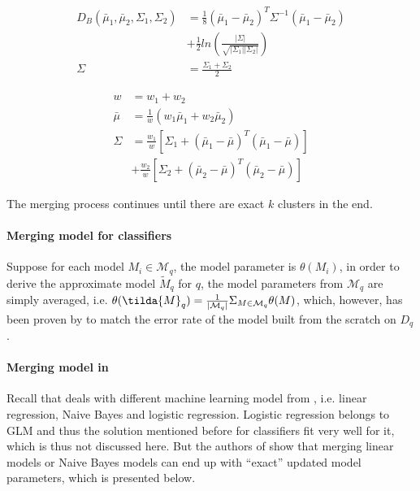 \begin{equation}\label{eq: db_distance}
\begin{split}
    D_B(\bar{\mu}_1, \bar{\mu}_2, \Sigma_1, \Sigma_2) &=
    \frac{1}{8}(\bar{\mu}_1-\bar{\mu}_2)^T\Sigma^{-1}(\bar{\mu}_1 -\bar{\mu}_2) \\&+ \frac{1}{2}ln(\frac{|\Sigma|}{\sqrt{|\Sigma_1||\Sigma_2|}})\\
    \Sigma &= \frac{\Sigma_1 + \Sigma_2}{2}
\end{split}
\end{equation}

\begin{equation}\label{eq: GMM_merging}
    \begin{split}
        w &= w_1 + w_2\\
        \bar{\mu} &= \frac{1}{w}(w_1\bar{\mu}_1 + w_2\bar{\mu}_2)\\
        \Sigma &= \frac{w_1}{w}[\Sigma_1 + (\bar{\mu}_1 - \bar{\mu})^T(\bar{\mu}_1 -\bar{\mu})]\\
        &+\frac{w_2}{w}[\Sigma_2 + (\bar{\mu}_2 - \bar{\mu})^T(\bar{\mu}_2 -\bar{\mu})]
    \end{split}
\end{equation}

The merging process continues until there are exact $k$ clusters in the end.


\paragraph{Merging model for classifiers}
Suppose for each model $M_i \in \mathcal{M}_q$, the model parameter is $\theta(M_i)$, in order to derive the approximate model $\tilde{M}_q$ for $q$, the model parameters from $\mathcal{M}_q$ are simply averaged, i.e. $\theta(\tilda{M}_q) = \frac{1}{|\mathcal{M}_q|}\Sigma_{M \in \mathcal{M}_q}\theta(M)$, which, however, has been proven by \cite{zhang2012communication} to match the error rate of the model built from the scratch on $D_q$.

\paragraph{Merging model in \cite{gupta2015processing}} Recall that \cite{gupta2015processing} deals with different machine learning model from \cite{hasani2018efficient}, i.e. linear regression, Naive Bayes and logistic regression. Logistic regression belongs to GLM and thus the solution mentioned before for classifiers fit very well for it, which is thus not discussed here. But the authors of \cite{gupta2015processing} show that merging linear models or Naive Bayes models can end up with ``exact'' updated model parameters, which is presented below.

